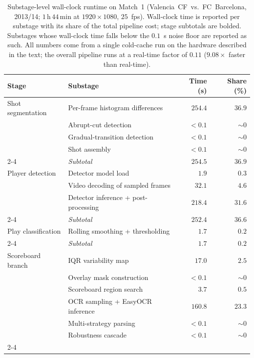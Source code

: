\begin{table}[!tbp]
\centering
\caption{Substage-level wall-clock runtime on Match~1 (Valencia~CF~vs.~FC~Barcelona, 2013/14; $1\,\mathrm{h}\,44\,\mathrm{min}$ at $1920\times 1080$, $25$~fps). Wall-clock time is reported per substage with its share of the total pipeline cost; stage subtotals are bolded. Substages whose wall-clock time falls below the $0.1$~s noise floor are reported as such. All numbers come from a single cold-cache run on the hardware described in the text; the overall pipeline runs at a real-time factor of $0.11$ ($9.08\times$ faster than real-time).}
\label{tab:runtime}
\setlength{\tabcolsep}{4pt}
\begin{tabular}{llrr}
\toprule
\textbf{Stage} & \textbf{Substage} & \textbf{Time (s)} & \textbf{Share (\%)} \\
\midrule
Shot segmentation & Per-frame histogram differences & $254.4$ & $36.9$ \\
 & Abrupt-cut detection & $< 0.1$ & $\sim 0$ \\
 & Gradual-transition detection & $< 0.1$ & $\sim 0$ \\
 & Shot assembly & $< 0.1$ & $\sim 0$ \\
\cmidrule(lr){2-4}
 & \textit{Subtotal} & $\mathbf{254.5}$ & $\mathbf{36.9}$ \\
\midrule
Player detection & Detector model load & $1.9$ & $0.3$ \\
 & Video decoding of sampled frames & $32.1$ & $4.6$ \\
 & Detector inference + post-processing & $218.4$ & $31.6$ \\
\cmidrule(lr){2-4}
 & \textit{Subtotal} & $\mathbf{252.4}$ & $\mathbf{36.6}$ \\
\midrule
Play classification & Rolling smoothing + thresholding & $1.7$ & $0.2$ \\
\cmidrule(lr){2-4}
 & \textit{Subtotal} & $\mathbf{1.7}$ & $\mathbf{0.2}$ \\
\midrule
Scoreboard branch & IQR variability map & $17.0$ & $2.5$ \\
 & Overlay mask construction & $< 0.1$ & $\sim 0$ \\
 & Scoreboard region search & $3.7$ & $0.5$ \\
 & OCR sampling + EasyOCR inference & $160.8$ & $23.3$ \\
 & Multi-strategy parsing & $< 0.1$ & $\sim 0$ \\
 & Robustness cascade & $< 0.1$ & $\sim 0$ \\
\cmidrule(lr){2-4}

\end{tabular}
\end{table}
